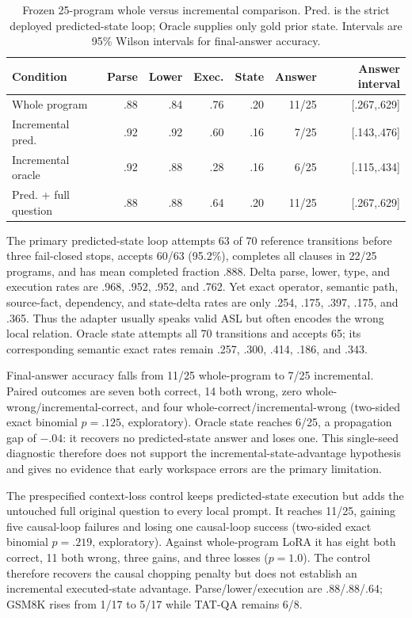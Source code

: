 \documentclass[11pt]{article}
\begin{document}
\begin{table}[t]
\centering\small
\caption{Frozen 25-program whole versus incremental comparison. Pred. is the
strict deployed predicted-state loop; Oracle supplies only gold prior state.
Intervals are 95\% Wilson intervals for final-answer accuracy.}
\label{tab:asl-incremental-program}
\begin{tabular}{lrrrrrr}
\toprule
Condition & Parse & Lower & Exec. & State & Answer & Answer interval\\
\midrule
Whole program      & .88 & .84 & .76 & .20 & 11/25 & [.267,.629]\\
Incremental pred.  & .92 & .92 & .60 & .16 &  7/25 & [.143,.476]\\
Incremental oracle & .92 & .88 & .28 & .16 &  6/25 & [.115,.434]\\
Pred. + full question & .88 & .88 & .64 & .20 & 11/25 & [.267,.629]\\
\bottomrule
\end{tabular}
\end{table}

The primary predicted-state loop attempts 63 of 70 reference transitions before
three fail-closed stops, accepts 60/63 (95.2\%), completes all clauses in 22/25
programs, and has mean completed fraction .888. Delta parse, lower, type, and
execution rates are .968, .952, .952, and .762. Yet exact operator, semantic path,
source-fact, dependency, and state-delta rates are only .254, .175, .397, .175,
and .365. Thus the adapter usually speaks valid ASL but often encodes the wrong
local relation. Oracle state attempts all 70 transitions and accepts 65; its
corresponding semantic exact rates remain .257, .300, .414, .186, and .343.

Final-answer accuracy falls from 11/25 whole-program to 7/25 incremental. Paired
outcomes are seven both correct, 14 both wrong, zero whole-wrong/incremental-correct,
and four whole-correct/incremental-wrong (two-sided exact binomial $p=.125$,
exploratory). Oracle state reaches 6/25, a propagation gap of $-.04$: it recovers
no predicted-state answer and loses one. This single-seed diagnostic therefore
does not support the incremental-state-advantage hypothesis and gives no evidence
that early workspace errors are the primary limitation.

The prespecified context-loss control keeps predicted-state execution but adds
the untouched full original question to every local prompt. It reaches 11/25,
gaining five causal-loop failures and losing one causal-loop success (two-sided
exact binomial $p=.219$, exploratory). Against whole-program LoRA it has eight
both correct, 11 both wrong, three gains, and three losses ($p=1.0$). The control
therefore recovers the causal chopping penalty but does not establish an
incremental executed-state advantage. Parse/lower/execution are .88/.88/.64;
GSM8K rises from 1/17 to 5/17 while TAT-QA remains 6/8.
\end{document}
